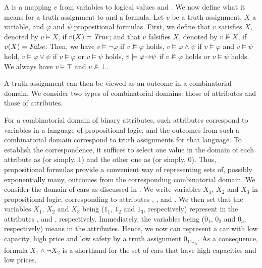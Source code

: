 A  is a mapping $v$ from variables to logical
values  and .
We now define what it means for a truth assignment to  
and  a formula.
Let $v$ be a truth assignment, $X$ a variable, and $\varphi$ and $\psi$
propositional formulas.
First, we define that $v$ satisfies $X$, denoted by $v \models X$,
if $v(X)=\textit{True}$; and that $v$ falsifies $X$, denoted 
by $v \not\models X$, if $v(X)=\textit{False}$.
Then, we have $v \models \neg \varphi$
if  $v \not\models \varphi$ holds, $v \models \varphi \land \psi$
if $v \models \varphi$ and $v \models \psi$ hold, $v \models \varphi \lor \psi$
if $v \models \varphi$ or $v \models \psi$ holds, $v \models \varphi \mathit{\rightarrow} \psi$
if $v \not\models \varphi$ holds or $v \models \psi$ holds.
We always have $v \models \top$ and $v \not\models \bot$.

A truth assignment can then be viewed as an outcome in a combinatorial domain.
We consider two types of combinatorial domains: those of  attributes
and those of  attributes.

For a combinatorial domain of binary attributes, such attributes correspond
to variables in a language of propositional logic, and the outcomes
from such a combinatorial domain correspond to truth assignments for that
language. To establish the correspondence, it suffices to select one
value in the domain of each attribute as  (or simply, $1$) 
and the other one as  (or simply, $0$).
Thus, propositional formulas provide a convenient way of representing
sets of, possibly exponentially many, outcomes from the corresponding 
combinatorial domain.
We consider the domain of cars as discussed in .
We write variables $X_1$, $X_2$ and $X_3$ in propositional logic, 
corresponding to attributes
, , and .
We then set that the variables $X_1$, $X_2$ and $X_3$ being 
 ($1_1$, $1_2$ and $1_3$, respectively) represent  in
the attributes ,  and , respectively.
Immediately, the variables being  ($0_1$, $0_2$ and $0_3$, respectively)
means  in the attributes.
Hence, we now can represent a car with low capacity, high price and low
safety by a truth assignment $0_11_20_3$.
As a consequence, formula $X_1\land \neg X_2$ is a shorthand for the set of
cars that have high capacities and low prices.

